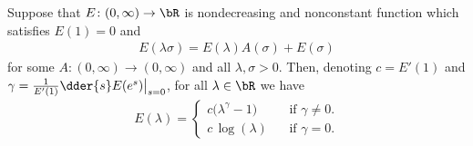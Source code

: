 \begin{lemma}
  \label{lem:solve-E}
   \leanok
  Suppose that $E \colon (0,\infty) \to \bR$
  is nondecreasing and nonconstant function which satisfies $E(1) = 0$ and
  \begin{align*}
  E(\lambda \sigma) = E(\lambda) A(\sigma) + E(\sigma)
  \end{align*}
  for some $A \colon (0,\infty) \to (0,\infty)$ and all $\lambda, \sigma > 0$.
  Then, denoting $c = E'(1)$ and $\gamma = \frac{1}{E'(1)} \dder{s} E(e^s) \big|_{s=0}$,
  for all $\lambda \in \bR$ we have
  \begin{align*}
  E(\lambda) = \begin{cases}
    c \big( \lambda^\gamma - 1 \big) & \;\;\text{ if $\gamma \ne 0$.} \\
    c \, \log (\lambda) & \;\;\text{ if $\gamma = 0$.}
    \end{cases}
  \end{align*}
\end{lemma}

